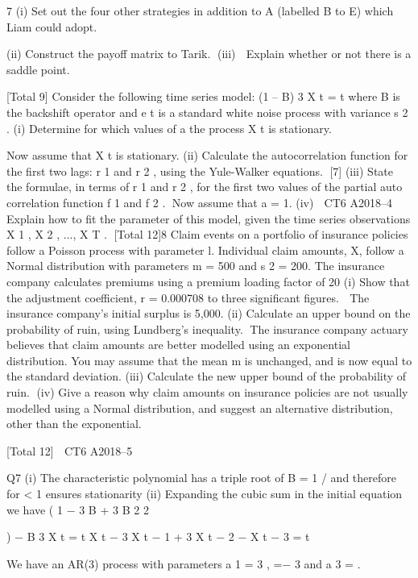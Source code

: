 \documentclass[a4paper,12pt]{article}
\begin{document}
 
7
(i) Set out the four other strategies in addition to A (labelled B to E) which Liam
could adopt.

(ii) Construct the payoff matrix to Tarik.
(iii)
 Explain whether or not there is a saddle point.


[Total 9]
Consider the following time series model:
(1 – \alpha B) 3 X t = \varepsilon t
where B is the backshift operator and e t is a standard white noise process with
variance s 2 .
(i)
Determine for which values of a the process X t is stationary.

Now assume that X t is stationary.
(ii) Calculate the autocorrelation function for the first two lags: r 1 and r 2 , using
the Yule-Walker equations.
[7]
(iii) State the formulae, in terms of r 1 and r 2 , for the first two values of the partial
auto correlation function f 1 and f 2 .
Now assume that a = 1.
(iv)

CT6 A2018–4
Explain how to fit the parameter of this model, given the time series
observations X 1 , X 2 , ..., X T .
[Total 12]8
Claim events on a portfolio of insurance policies follow a Poisson process with
parameter l. Individual claim amounts, X, follow a Normal distribution with
parameters m = 500 and s 2 = 200.
The insurance company calculates premiums using a premium loading factor of 20%
(i)
Show that the adjustment coefficient, r = 0.000708 to three significant figures.

The insurance company’s initial surplus is 5,000.
(ii)
Calculate an upper bound on the probability of ruin, using Lundberg’s
inequality.
The insurance company actuary believes that claim amounts are better modelled using
an exponential distribution. You may assume that the mean m is unchanged, and is
now equal to the standard deviation.
(iii) Calculate the new upper bound of the probability of ruin.
(iv) Give a reason why claim amounts on insurance policies are not usually
modelled using a Normal distribution, and suggest an alternative distribution,
other than the exponential.

[Total 12]

CT6 A2018–5 

Q7
(i) The characteristic polynomial has a triple root of B = 1 / \alpha 
and therefore for \alpha  < 1 ensures stationarity
(ii) Expanding the cubic sum in the initial equation we have
( 1 − 3 \alpha  B + 3 \alpha  B
2 2


)
−  B 3 X t = \varepsilon t
X t − 3 \alpha  X t − 1 + 3  X t − 2 −  X t − 3 = \varepsilon t

We have an AR(3) process with parameters a 1 = 3 \alpha  ,  =− 3  and a 3 = 
.
\end{document}
